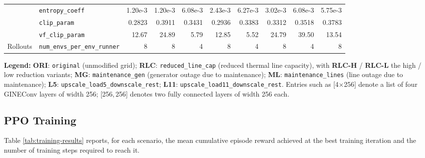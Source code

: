 \begin{table}[htbp]
{\begin{tabular}{@{}llrrrrrrrr@{}}
      & \texttt{entropy\_coeff}        & 1.20e-3 & 1.20e-3 & 6.08e-3 & 2.43e-3 & 6.27e-3 & 3.02e-3 & 6.08e-3 & 5.75e-3 \\
      & \texttt{clip\_param}           & 0.2823 & 0.3911 & 0.3431 & 0.2936 & 0.3383 & 0.3312 & 0.3518 & 0.3783 \\
      & \texttt{vf\_clip\_param}       & 12.67 & 24.89 & 5.79 & 12.85 & 5.52 & 24.79 & 39.50 & 13.54 \\
    \midrule
    Rollouts
      & \texttt{num\_envs\_per\_env\_runner} & 8 & 8 & 4 & 8 & 4 & 8 & 4 & 8 \\
    \bottomrule
  \end{tabular}}

  \vspace{0.5em}
  \begin{minipage}{\textwidth}
    \footnotesize
    \textbf{Legend:}
    \textbf{ORI}: \texttt{original} (unmodified grid);
    \textbf{RLC}: \texttt{reduced\_line\_cap} (reduced thermal line capacity),
    with \textbf{RLC-H} / \textbf{RLC-L} the high / low reduction variants;
    \textbf{MG}: \texttt{maintenance\_gen} (generator outage due to maintenance);
    \textbf{ML}: \texttt{maintenance\_lines} (line outage due to maintenance);
    \textbf{L5}: \texttt{upscale\_load5\_downscale\_rest};
    \textbf{L11}: \texttt{upscale\_load11\_downscale\_rest}.
    Entries such as \mbox{[4$\times$256]} denote a list of four GINEConv layers of width 256;
    \mbox{[256,\,256]} denotes two fully connected layers of width 256 each.
  \end{minipage}
\end{table}

\FloatBarrier

\subsection{PPO Training}
Table \ref{tab:training-results} reports, for each scenario, the mean cumulative episode reward achieved at the best training iteration and the number of training steps required to reach it.


